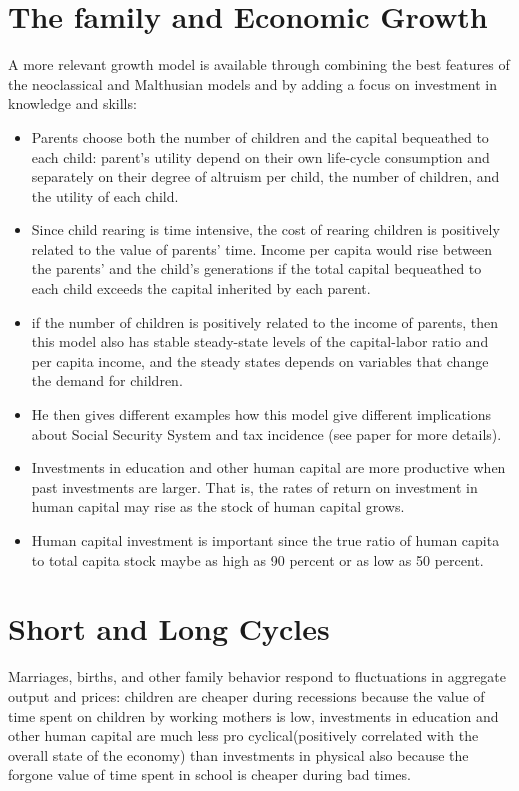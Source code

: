 \documentclass[11pt]{article}
\begin{document}
\section{The family and Economic Growth}
 A more relevant growth model is available through combining the best features of the neoclassical and Malthusian models and by adding a focus on investment in knowledge and skills:
 \begin{itemize}
 	\item Parents choose both the number of children and the capital bequeathed to each child: parent's utility depend on their own life-cycle consumption and separately on their degree of altruism per child, the number of children, and the utility of each child. 
	\item Since child rearing is time intensive, the cost of rearing children is positively related to the value of parents' time. Income per capita would rise between the parents' and the child's generations if the total capital bequeathed to each child exceeds the capital inherited by each parent.  
	\item if the number of children is positively related to the income of parents, then this model also has stable steady-state levels of the capital-labor ratio and per capita income, and the steady states depends on variables that change the demand for children. 
	\item He then gives different examples how this model give different implications about Social Security System and tax incidence (see paper for more details). 
	\item Investments in education and other human capital are more productive when past investments are larger. That is, the rates of return on investment in human capital may rise as the stock of human capital grows.
	\item Human capital investment is important since the true ratio of human capita to total capita stock maybe as high as 90 percent or as low as 50 percent. 
 \end{itemize}
 
 \section{Short and Long Cycles}
Marriages, births, and other family behavior respond to fluctuations in aggregate output and prices: children are cheaper during recessions because the value of time spent on children by working mothers is low, investments in education and other human capital are much less pro cyclical(positively correlated with the overall state of the economy) than investments in physical also because the forgone value of time spent in school is cheaper during bad times.  
\end{document}
